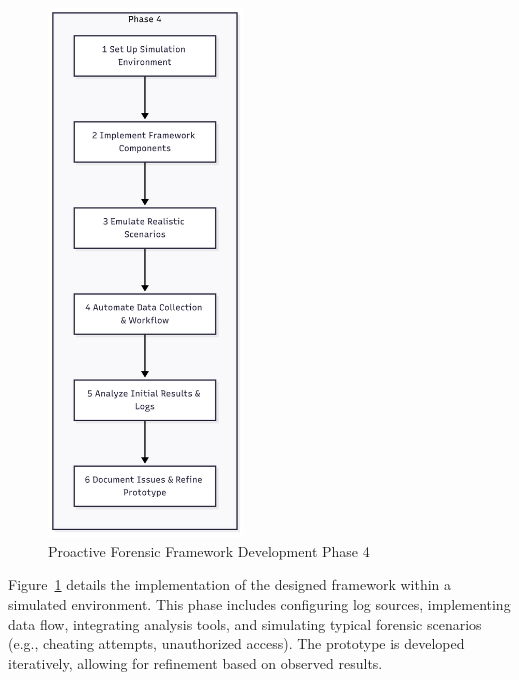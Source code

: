 \begin{figure}[H]
    \centering
    \includegraphics[height=14cm]{figure/framework-development-phase-4.png}
    \caption{Proactive Forensic Framework Development Phase 4}
    \label{fig:framework-development-phase-4}
\end{figure}

Figure~\ref{fig:framework-development-phase-4} details the implementation of the designed framework within a simulated environment. This phase includes configuring log sources, implementing data flow, integrating analysis tools, and simulating typical forensic scenarios (e.g., cheating attempts, unauthorized access). The prototype is developed iteratively, allowing for refinement based on observed results.


